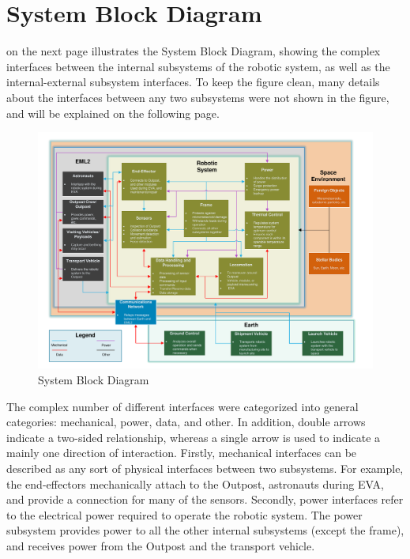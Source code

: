 \documentclass[12pt, letterpaper]{article}
\begin{document}
\section{System Block Diagram}
\label{sect:SBD}
 on the next page illustrates the System Block Diagram, showing the complex interfaces between the internal subsystems of the robotic system, as well as the internal-external subsystem interfaces. To keep the figure clean, many details about the interfaces between any two subsystems were not shown in the figure, and will be explained on the following page.
\begin{landscape}
\begin{figure}[H]
\centering
\includegraphics[height=0.9\textheight]{SBD}
\caption{System Block Diagram}
\label{fig:SBD}
\end{figure}
\end{landscape}
The complex number of different interfaces were categorized into general categories: mechanical, power, data, and other. In addition, double arrows indicate a two-sided relationship, whereas a single arrow is used to indicate a mainly one direction of interaction. Firstly, mechanical interfaces can be described as any sort of physical interfaces between two subsystems. For example, the end-effectors mechanically attach to the Outpost, astronauts during EVA, and provide a connection for many of the sensors. Secondly, power interfaces refer to the electrical power required to operate the robotic system. The power subsystem provides power to all the other internal subsystems (except the frame), and receives power from the Outpost and the transport vehicle. 
\end{document}
